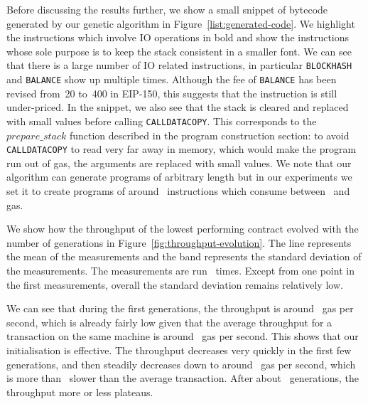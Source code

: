 Before discussing the results further, we show a small snippet of bytecode generated by our genetic algorithm in Figure~\ref{list:generated-code}. We highlight the instructions which involve IO operations in bold and show the instructions whose sole purpose is to keep the stack consistent in a smaller font. We can see that there is a large number of IO related instructions, in particular \lstinline{BLOCKHASH} and \lstinline{BALANCE} show up multiple times. Although the fee of \lstinline{BALANCE} has been revised from~20 to~400 in EIP-150, this suggests that the instruction is still under-priced. In the snippet, we also see that the stack is cleared and replaced with small values before calling \lstinline{CALLDATACOPY}. This corresponds to the $prepare\_stack$ function described in the program construction section: to avoid \lstinline{CALLDATACOPY} to read very far away in memory, which would make the program run out of gas, the arguments are replaced with small values. We note that our algorithm can generate programs of arbitrary length but in our experiments we set it to create programs of around~ instructions which consume between~ and  gas.

We show how the throughput of the lowest performing contract evolved with the number of generations in Figure~\ref{fig:throughput-evolution}. The line represents the mean of the measurements and the band represents the standard deviation of the measurements. The measurements are run~ times. Except from one point in the first measurements, overall the standard deviation remains relatively low. 

We can see that during the first generations, the throughput is around~ gas per second, which is already fairly low given that the average throughput for a transaction on the same machine is around~ gas per second. This shows that our initialisation is effective. The throughput decreases very quickly in the first few generations, and then steadily decreases down to around~ gas per second, which is more than~ slower than the average transaction. After about~ generations, the throughput more or less plateaus.  

